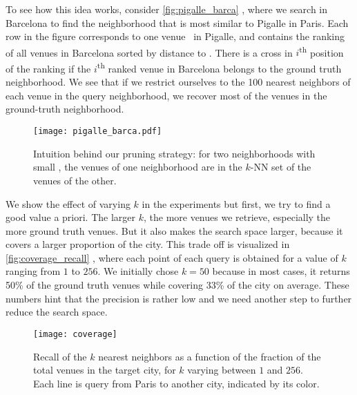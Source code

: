 To see how this idea works, consider \autoref{fig:pigalle_barca}
, 
where we search in Barcelona to find the neighborhood that is most
similar to Pigalle in Paris. 
Each row in the figure corresponds to one venue \venue\ in Pigalle, 
and contains the ranking of all venues in Barcelona sorted by distance to
\venue. 
There is a cross
 in $i$\textsuperscript{th} position of the ranking if the
$i$\textsuperscript{th} ranked venue in Barcelona belongs to the ground truth
neighborhood.
We see that if we restrict ourselves to the 100 nearest neighbors of
each venue in the query neighborhood, 
we recover most of the venues in the ground-truth neighborhood.

\begin{figure}[b]
    \centering
    \texttt{[image: pigalle\_barca.pdf]}
    \caption[Ranking of target city venues by distance to query
    venus.]{Intuition behind our pruning strategy: 
for two neighborhoods with small \emd, 
the venues of one neighborhood are in the $k$-NN set of the venues of
the other.  \label{fig:pigalle_barca}}
\end{figure}

We show the effect of varying $k$ in the experiments but first, we try to find
a good value a priori.  The larger $k$, the more venues we retrieve,
especially the more ground truth venues. But it also makes the search space larger,
because it covers a larger proportion of the city. This trade off is visualized
in \autoref{fig:coverage_recall} , where each point of each query is obtained
for a value of $k$ ranging from $1$ to $256$. We initially chose $k=50$
because in most cases, it returns 50\% of the ground truth venues while covering 33\%
of the city on average. These numbers hint that the precision is rather low and
we need another step to further reduce the search space.

\medskip

\begin{figure}[tb]
    \centering
    \texttt{[image: coverage]}
    \caption[Recall vs coverage of $k$ nearest neighbors]{Recall of the $k$
	    nearest neighbors as a function of the fraction of the total
	    venues in the target city, for $k$ varying between $1$ and $256$.
	    Each line is query from Paris to another city, indicated by its
	    color.\label{fig:coverage_recall}}
\end{figure}



